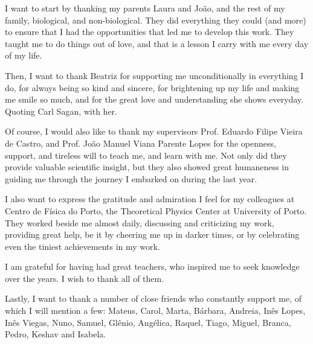 
\begin{acknowledgments} 

I want to start by thanking my parents Laura and João, and the rest of my family, biological, and non-biological.
They did everything they could (and more) to ensure that I had the opportunities that led me to develop this work.
They taught me to do things out of love, and that is a lesson I carry with me every day of my life.

Then, I want to thank Beatriz for supporting me unconditionally in everything I do, for always being  so kind and sincere, for brightening up my life and making me smile so much, and for the great love and understanding she shows everyday.
Quoting Carl Sagan,  with her.

Of course, I would also like to thank my supervisors Prof. Eduardo Filipe Vieira de Castro, and Prof. João Manuel Viana Parente Lopes for the openness, support, and tireless will to teach me, and learn with me.
Not only did they provide valuable scientific insight, but they also showed great humaneness in guiding me through the journey I embarked on during the last year.

I also want to express the gratitude and admiration I feel for my colleagues at Centro de Física do Porto, the Theoretical Physics Center at University of Porto.
They worked beside me almost daily, discussing and criticizing my work, providing great help, be it by cheering me up in darker times, or by celebrating even the tiniest achievements in my work.

I am grateful for having had great teachers, who inspired me to seek knowledge over the years. I wish to thank all of them. %

Lastly, I want to thank a number of close friends who constantly support me, of which I will mention a few: Mateus, Carol, Marta, Bárbara, Andreia, Inês Lopes, Inês Viegas, Nuno, Samuel, Glênio, Angélica, Raquel, Tiago, Miguel, Branca, Pedro, Keshav and Isabela. 

\end{acknowledgments}
\clearpage
\thispagestyle{empty}
\cleardoublepage